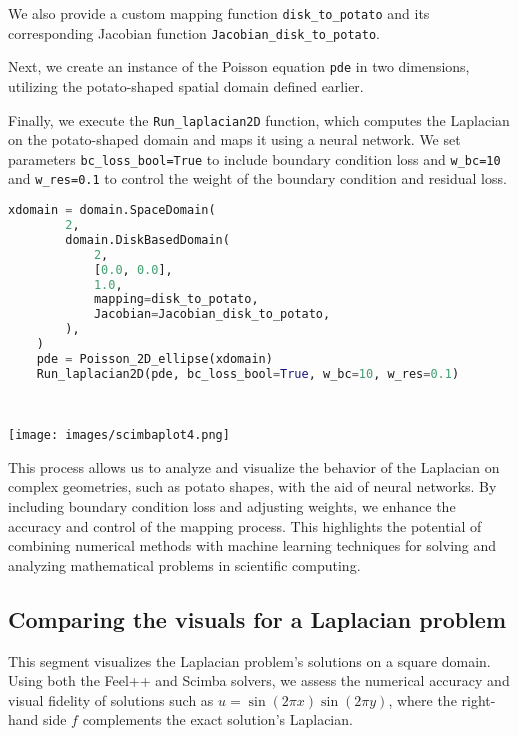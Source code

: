 \documentclass[12pt]{article}
\begin{document}
We also provide a custom mapping function \texttt{disk\_to\_potato} and its corresponding Jacobian function \texttt{Jacobian\_disk\_to\_potato}.

Next, we create an instance of the Poisson equation \texttt{pde} in two dimensions, utilizing the potato-shaped spatial domain defined earlier.

Finally, we execute the \texttt{Run\_laplacian2D} function, which computes the Laplacian on the potato-shaped domain and maps it using a neural network. We set parameters \texttt{bc\_loss\_bool=True} to include boundary condition loss and \texttt{w\_bc=10} and \texttt{w\_res=0.1} to control the weight of the boundary condition and residual loss.

\newpage
\begin{lstlisting}[language=Python,caption={},frame=single, backgroundcolor=\color{gray!10}, basicstyle=\footnotesize,rulecolor=\color{blue}, framexleftmargin=3pt, commentstyle=\color{mygreen}, keywordstyle=\color{blue}]
    xdomain = domain.SpaceDomain(
        2,
        domain.DiskBasedDomain(
            2,
            [0.0, 0.0],
            1.0,
            mapping=disk_to_potato,
            Jacobian=Jacobian_disk_to_potato,
        ),
    )
    pde = Poisson_2D_ellipse(xdomain)
    Run_laplacian2D(pde, bc_loss_bool=True, w_bc=10, w_res=0.1)

    
\end{lstlisting}
\begin{frame}{}
    \begin{center}
        \texttt{[image: images/scimbaplot4.png]}

    \end{center}
\end{frame}

This process allows us to analyze and visualize the behavior of the Laplacian on complex geometries, such as potato shapes, with the aid of neural networks. By including boundary condition loss and adjusting weights, we enhance the accuracy and control of the mapping process. This highlights the potential of combining numerical methods with machine learning techniques for solving and analyzing mathematical problems in scientific computing.
\newpage

\subsection{Comparing the visuals for a Laplacian problem }

This segment visualizes the Laplacian problem's solutions on a square domain. Using both the Feel++ and Scimba solvers, we assess the numerical accuracy and visual fidelity of solutions such as \( u = \sin(2\pi x) \sin(2\pi y) \), where the right-hand side \( f \) complements the exact solution's Laplacian.
\end{document}
